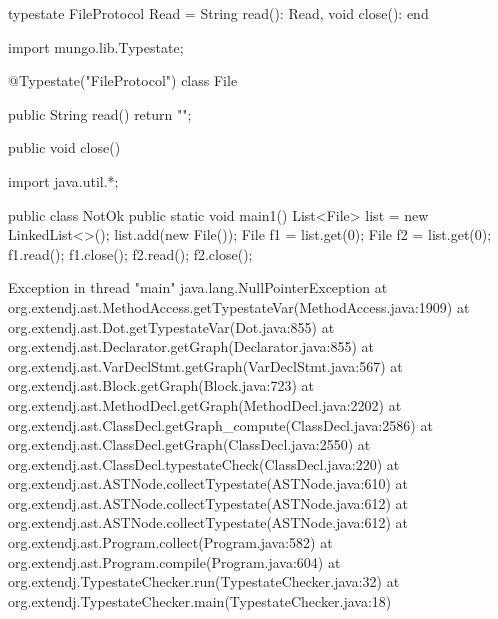 \begin{code}
typestate FileProtocol {
  Read = {
    String read(): Read,
    void close(): end
  }
}\end{code}

\begin{code}
import mungo.lib.Typestate;

@Typestate("FileProtocol")
class File {

  public String read() {
    return "";
  }

  public void close() {
  }

}\end{code}

\begin{code}
import java.util.*;

public class NotOk {
  public static void main1() {
    List<File> list = new LinkedList<>();
    list.add(new File());
    File f1 = list.get(0);
    File f2 = list.get(0);
    f1.read();
    f1.close();
    f2.read();
    f2.close();
  }
}\end{code}

\lstset{language=,caption=Original Mungo output}
\begin{code}
Exception in thread "main" java.lang.NullPointerException
	at org.extendj.ast.MethodAccess.getTypestateVar(MethodAccess.java:1909)
	at org.extendj.ast.Dot.getTypestateVar(Dot.java:855)
	at org.extendj.ast.Declarator.getGraph(Declarator.java:855)
	at org.extendj.ast.VarDeclStmt.getGraph(VarDeclStmt.java:567)
	at org.extendj.ast.Block.getGraph(Block.java:723)
	at org.extendj.ast.MethodDecl.getGraph(MethodDecl.java:2202)
	at org.extendj.ast.ClassDecl.getGraph_compute(ClassDecl.java:2586)
	at org.extendj.ast.ClassDecl.getGraph(ClassDecl.java:2550)
	at org.extendj.ast.ClassDecl.typestateCheck(ClassDecl.java:220)
	at org.extendj.ast.ASTNode.collectTypestate(ASTNode.java:610)
	at org.extendj.ast.ASTNode.collectTypestate(ASTNode.java:612)
	at org.extendj.ast.ASTNode.collectTypestate(ASTNode.java:612)
	at org.extendj.ast.Program.collect(Program.java:582)
	at org.extendj.ast.Program.compile(Program.java:604)
	at org.extendj.TypestateChecker.run(TypestateChecker.java:32)
	at org.extendj.TypestateChecker.main(TypestateChecker.java:18)
\end{code}

